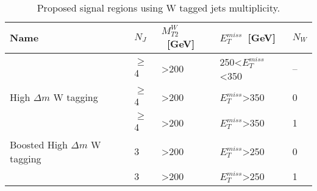 \begin{table}[h]
\begin{center}
\begin{tabular}{|l|l|l|l|l|}
\hline
Name            & $N_{J}$  & $M_{T2}^{W}$~[GeV]            & $E_{T}^{miss}$~[GeV]    & $N_{W}$ \\
\hline
\hline
                          & $\geq$4  & >200                & 250<$E_{T}^{miss}$<350   & --   \\
High $\Delta m$ W tagging & $\geq$4  & >200                & $E_{T}^{miss}$>350       & 0    \\
                          & $\geq$4  & >200                & $E_{T}^{miss}$>350       & 1    \\
\hline
Boosted High $\Delta m$ W tagging & 3  & >200              & $E_{T}^{miss}$>250 & 0  \\
                                  & 3  & >200              & $E_{T}^{miss}$>250 & 1  \\
\hline
\end{tabular}
\caption[Table caption text]{ Proposed signal regions using W tagged jets multiplicity. }
\label{tab:SRW}
\end{center}
\end{table}

